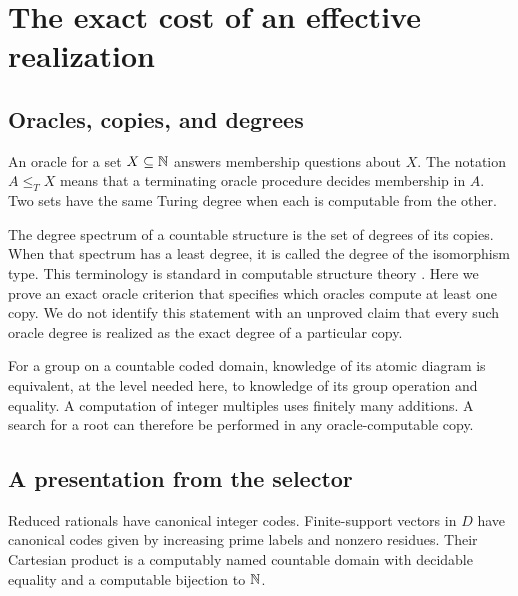 \chapter{The exact cost of an effective realization}
\label{ch:computability}

\section{Oracles, copies, and degrees}
An oracle for a set $X\subseteq\mathbb N$ answers membership questions about $X$. The notation $A\le_T X$ means that a terminating oracle procedure decides membership in $A$. Two sets have the same Turing degree when each is computable from the other.

The degree spectrum of a countable structure is the set of degrees of its copies. When that spectrum has a least degree, it is called the degree of the isomorphism type. This terminology is standard in computable structure theory \cite{Montalban,Calvert}. Here we prove an exact oracle criterion that specifies which oracles compute at least one copy. We do not identify this statement with an unproved claim that every such oracle degree is realized as the exact degree of a particular copy.

For a group on a countable coded domain, knowledge of its atomic diagram is equivalent, at the level needed here, to knowledge of its group operation and equality. A computation of integer multiples uses finitely many additions. A search for a root can therefore be performed in any oracle-computable copy.

\section{A presentation from the selector}
Reduced rationals have canonical integer codes. Finite-support vectors in $D$ have canonical codes given by increasing prime labels and nonzero residues. Their Cartesian product is a computably named countable domain with decidable equality and a computable bijection to $\mathbb N$.

